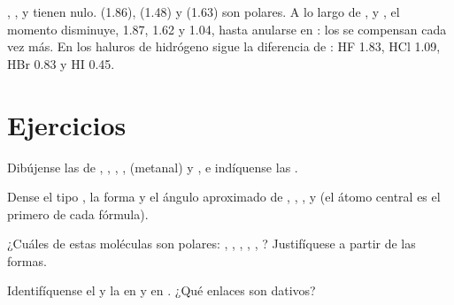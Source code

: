 \begin{example}\label{ex:b1:lewis-resonance-vsepr:dipoles}
, ,  y  tienen  nulo.
 (\qty{1.86}{\debye}),  (\qty{1.48}{\debye}) y
 (\qty{1.63}{\debye}) son polares. A lo largo de ,
 y , el momento disminuye, 1.87, 1.62 y
\qty{1.04}{\debye}, hasta anularse en : los 
 se compensan cada vez más. En los haluros de hidrógeno sigue la
diferencia de : HF 1.83, HCl 1.09, HBr 0.83 y HI
\qty{0.45}{\debye}.
\end{example}

\section{Ejercicios}

\begin{exercise}[$\star$]\label{exo:b1:lewis-resonance-vsepr:1}
Dibújense las  de , , ,
,  (metanal) y , e indíquense las .
\end{exercise}

\begin{exercise}[$\star$]\label{exo:b1:lewis-resonance-vsepr:2}
Dense el tipo , la forma y el ángulo aproximado de ,
, ,  y  (el átomo central es el
primero de cada fórmula).
\end{exercise}

\begin{exercise}[$\star$]\label{exo:b1:lewis-resonance-vsepr:3}
¿Cuáles de estas moléculas son polares: , , ,
, , ? Justifíquese a partir de las formas.
\end{exercise}

\begin{exercise}[$\star$]\label{exo:b1:lewis-resonance-vsepr:4}
Identifíquense el  y la  en
 y en . ¿Qué
enlaces son dativos?
\end{exercise}

